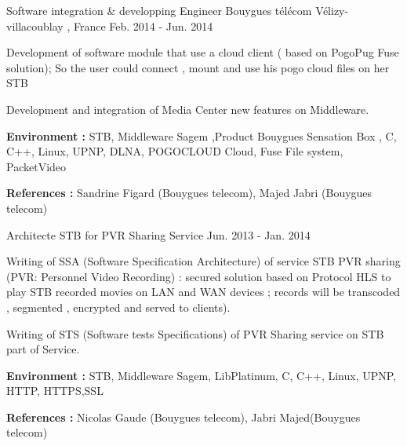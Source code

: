 \begin{cventries}
\cventry
{Software integration \& developping Engineer} %
{Bouygues télécom} %
{Vélizy-villacoublay , France} %
{Feb. 2014 - Jun. 2014} %
{ %
\begin{cvitems}
\item {Development of software module that use a cloud client ( based on PogoPug Fuse solution); So the user could connect , mount  and use his pogo cloud files on her STB}
\item {Development and integration of Media Center new features on Middleware.}
\item { \textbf{Environment :} STB, Middleware Sagem ,Product Bouygues Sensation Box ,  C, C++, Linux, UPNP, DLNA, POGOCLOUD Cloud, Fuse File system,  PacketVideo }
\item { \textbf{References :} Sandrine Figard (Bouygues telecom), Majed Jabri (Bouygues telecom) }
\end{cvitems}
}

\cventry
{Architecte STB for PVR Sharing Service} %
{}{}
{Jun. 2013  - Jan. 2014}
{ %
\begin{cvitems}
\item {Writing of SSA  (Software Specification Architecture) of service STB PVR sharing (PVR: Personnel Video Recording)  : secured solution based on Protocol HLS  to play STB recorded movies on LAN and WAN devices ; records will be transcoded , segmented , encrypted and served to clients).}
\item {Writing of STS (Software tests Specifications) of PVR Sharing service on STB part of Service.  }
\item { \textbf{Environment :} STB, Middleware Sagem, LibPlatinum, C, C++, Linux, UPNP, HTTP, HTTPS,SSL }
\item { \textbf{References :}  Nicolas Gaude (Bouygues telecom), Jabri Majed(Bouygues telecom) }
\end{cvitems}
}


\end{cventries}
